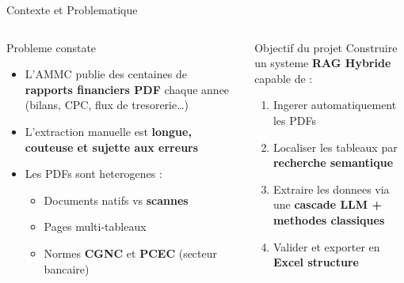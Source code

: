 \documentclass[aspectratio=169, 10pt]{beamer}
\begin{document}
\begin{frame}{Contexte et Problematique}
  \begin{columns}[T]
      \begin{alertblock}{Probleme constate}
        \begin{itemize}
          \item L'AMMC publie des centaines de \textbf{rapports financiers PDF}
                chaque annee (bilans, CPC, flux de tresorerie\ldots)
          \item L'extraction manuelle est \textbf{longue, couteuse et sujette
                aux erreurs}
          \item Les PDFs sont heterogenes :
                \begin{itemize}\small
                  \item Documents natifs vs \textbf{scannes}
                  \item Pages multi-tableaux
                  \item Normes \textbf{CGNC} et \textbf{PCEC} (secteur bancaire)
                \end{itemize}
        \end{itemize}
      \end{alertblock}

      \begin{block}{Objectif du projet}
        Construire un systeme \textbf{RAG Hybride} capable de :
        \begin{enumerate}\small
          \item Ingerer automatiquement les PDFs
          \item Localiser les tableaux par \textbf{recherche semantique}
          \item Extraire les donnees via une \textbf{cascade LLM + methodes classiques}
          \item Valider et exporter en \textbf{Excel structure}
        \end{enumerate}
      \end{block}
      \vspace{0.3cm}
  \end{columns}
\end{frame}
\end{document}
